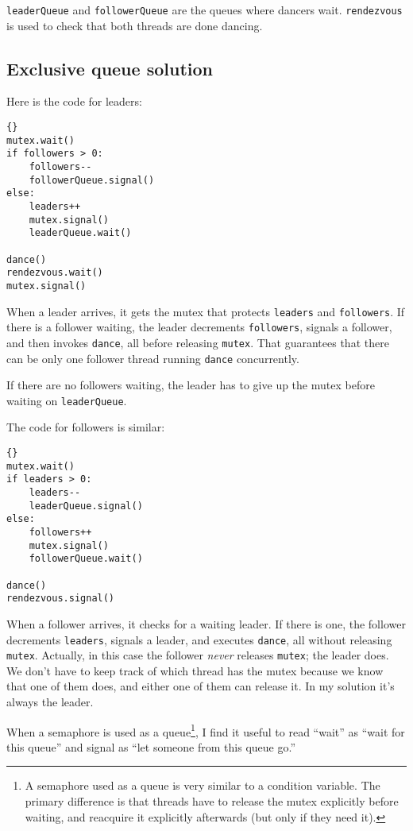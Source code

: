 \documentclass{book}
\newcommand{\clearemptydoublepage}{\newpage\cleardoublepage}
\begin{document}
{\tt leaderQueue} and {\tt followerQueue} are the queues where
dancers wait.  {\tt rendezvous} is used to check that both threads
are done dancing.



\clearemptydoublepage
\subsection {Exclusive queue solution}

Here is the code for leaders:

\begin{lstlisting}[title={Queue solution (leaders)}]{}
mutex.wait()
if followers > 0:
    followers--
    followerQueue.signal()
else:
    leaders++
    mutex.signal()
    leaderQueue.wait()    

dance()
rendezvous.wait()
mutex.signal()
\end{lstlisting}

When a leader arrives, it gets the mutex that protects {\tt leaders}
and {\tt followers}.  If there is a follower waiting, the leader
decrements {\tt followers}, signals a follower, and then invokes
{\tt dance}, all before releasing {\tt mutex}.  That guarantees that
there can be only one follower thread running {\tt dance}
concurrently.

If there are no followers waiting, the leader has to give up the mutex
before waiting on {\tt leaderQueue}.

The code for followers is similar:

\begin{lstlisting}[title={Queue solution (followers)}]{}
mutex.wait()
if leaders > 0:
    leaders--
    leaderQueue.signal()
else:
    followers++
    mutex.signal()
    followerQueue.wait()    

dance()
rendezvous.signal()
\end{lstlisting}

When a follower arrives, it checks for a waiting leader.  If there
is one, the follower decrements {\tt leaders}, signals a leader, and
executes {\tt dance}, all without releasing {\tt mutex}.  Actually,
in this case the follower {\em never} releases {\tt mutex};
the leader does.  We don't have to keep track of which thread has the
mutex because we know that one of them does, and either one of them can
release it.  In my solution it's always the leader.

When a semaphore is used as a queue\footnote{A semaphore used as a
queue is very similar to a condition variable.  The primary difference
is that threads have to release the mutex explicitly before waiting,
and reacquire it explicitly afterwards (but only if they need it).},
I find it useful to read ``wait'' as ``wait for this queue'' and
signal as ``let someone from this queue go.''
\end{document}
